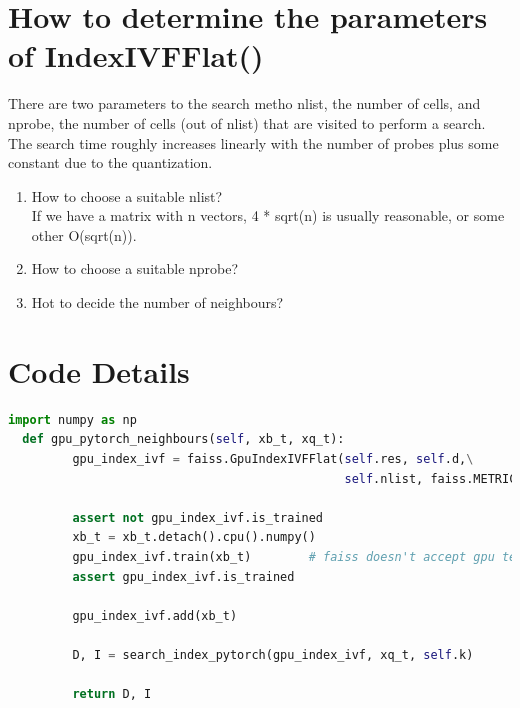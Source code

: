 \section{How to determine the parameters of IndexIVFFlat()}
There are two parameters to the search metho nlist, the number of cells, and nprobe, the number of cells (out of nlist) that are visited to perform a search. The search time roughly increases linearly with the number of probes plus some constant due to the quantization.  
\begin{enumerate}
    \item How to choose a suitable nlist?\\
If we have a matrix with n vectors, 4 * sqrt(n) is usually reasonable, or some other O(sqrt(n)). 
    \item How to choose a suitable nprobe?
    \item Hot to decide the number of neighbours? 
\end{enumerate}





\section{Code Details}

\begin{lstlisting}[language=Python, caption=Python example]
import numpy as np
  def gpu_pytorch_neighbours(self, xb_t, xq_t):
         gpu_index_ivf = faiss.GpuIndexIVFFlat(self.res, self.d,\
                                               self.nlist, faiss.METRIC_L2)

         assert not gpu_index_ivf.is_trained
         xb_t = xb_t.detach().cpu().numpy()
         gpu_index_ivf.train(xb_t)        # faiss doesn't accept gpu tensors
         assert gpu_index_ivf.is_trained

         gpu_index_ivf.add(xb_t)

         D, I = search_index_pytorch(gpu_index_ivf, xq_t, self.k)

         return D, I
\end{lstlisting}


